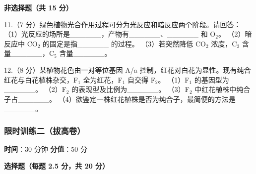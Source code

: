 \textbf{非选择题（共 15 分）}

11.（7 分）绿色植物光合作用过程可分为光反应和暗反应两个阶段。请回答：
（1）光反应的场所是\_\_\_\_\_\_，产物有\_\_\_\_\_\_、\_\_\_\_\_\_ 和 O$_2$。
（2）暗反应中 CO$_2$ 的固定是指\_\_\_\_\_\_ 的过程。
（3）若突然降低 CO$_2$ 浓度，C$_3$ 含量\_\_\_\_\_\_，C$_5$ 含量\_\_\_\_\_\_。
\vspace{2cm}

12.（8 分）某植物花色由一对等位基因 A/a 控制，红花对白花为显性。现有纯合红花与白花植株杂交，F$_1$ 全为红花，F$_1$ 自交得 F$_2$。
（1）F$_1$ 的基因型为\_\_\_\_\_\_。
（2）F$_2$ 的表现型及比例为\_\_\_\_\_\_。
（3）F$_2$ 中红花植株中纯合子占\_\_\_\_\_\_。
（4）欲鉴定一株红花植株是否为纯合子，最简便的方法是\_\_\_\_\_\_。
\vspace{2cm}

\subsubsection{限时训练二（拔高卷）}

\textbf{时间}：30 分钟 \quad \textbf{分值}：50 分

\textbf{选择题（每题 2.5 分，共 20 分）}

